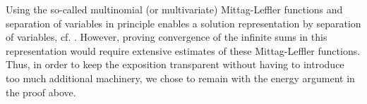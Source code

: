 \begin{remark}
Using the so-called multinomial (or multivariate) Mittag-Leffler functions and separation of variables in principle enables a solution representation by separation of variables, cf. \cite[Theorem 4.1]{LuchkoGorenflo:1999}.
However, proving convergence of the infinite sums in this representation would require extensive estimates of these Mittag-Leffler functions. Thus, in order to keep the exposition transparent without having to introduce too much additional machinery, we chose to remain with the energy argument in the proof above. 
\end{remark}

\begin{comment}
An inspection of the proof of Theorem~\ref{thm:sumfrac} shows that in particular coefficient settings, certain time dependent terms vanish and therefore a zero right hand side leads to a decrease of energy.
\begin{corollary}\label{cor:reg_sumfrac}
Under the conditions of Theorem~\ref{thm:sumfrac}, in case (ii) with 
$r=0$, $\alpha_0\in\{0,1\}$, the energy $\mathcal{E}_\gamma[u](t)+\mathcal{E}_\alpha[u](t)$ is a monotonically decreasing function of time.
\end{corollary}
\end{comment}

